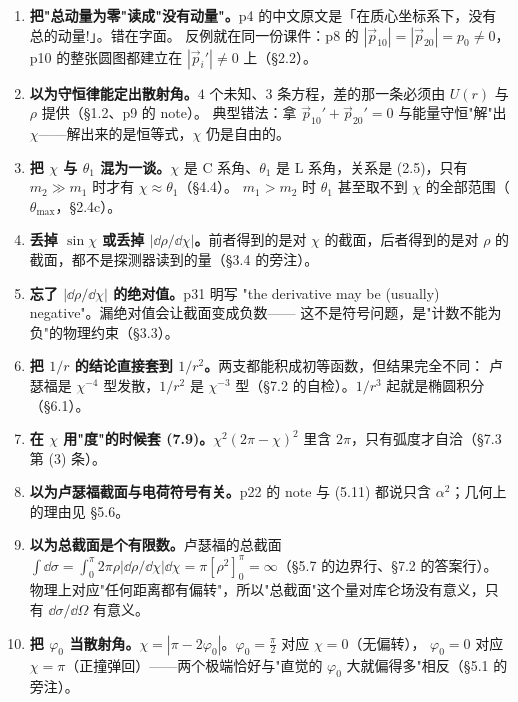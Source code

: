\documentclass[11pt]{ctexart}
\providecommand{\th}{}\renewcommand{\th}{\theta}
\begin{document}
\begin{enumerate}
\item \textbf{把"总动量为零"读成"没有动量"。}p4 的中文原文是「在质心坐标系下，没有总的动量!」。错在字面。
反例就在同一份课件：p8 的 $|\vec p_{10}|=|\vec p_{20}|=p_0\neq0$，p10 的整张圆图都建立在 $|\vec p_i'|\neq0$ 上（§2.2）。
\item \textbf{以为守恒律能定出散射角。}$4$ 个未知、$3$ 条方程，差的那一条必须由 $U(r)$ 与 $\rho$ 提供（§1.2、p9 的 note）。
典型错法：拿 $\vec p_{10}'+\vec p_{20}'=0$ 与能量守恒"解"出 $\chi$——解出来的是恒等式，$\chi$ 仍是自由的。
\item \textbf{把 $\chi$ 与 $\th_1$ 混为一谈。}$\chi$ 是 C 系角、$\th_1$ 是 L 系角，关系是 (2.5)，只有 $m_2\gg m_1$ 时才有 $\chi\approx\th_1$（§4.4）。
$m_1>m_2$ 时 $\th_1$ 甚至取不到 $\chi$ 的全部范围（$\th_{\max}$，§2.4c）。
\item \textbf{丢掉 $\sin\chi$ 或丢掉 $|\dd\rho/\dd\chi|$。}前者得到的是对 $\chi$ 的截面，后者得到的是对 $\rho$ 的截面，都不是探测器读到的量（§3.4 的旁注）。
\item \textbf{忘了 $|\dd\rho/\dd\chi|$ 的绝对值。}p31 明写 "the derivative may be (usually) negative"。漏绝对值会让截面变成负数——
这不是符号问题，是"计数不能为负"的物理约束（§3.3）。
\item \textbf{把 $1/r$ 的结论直接套到 $1/r^{2}$。}两支都能积成初等函数，但结果完全不同：
卢瑟福是 $\chi^{-4}$ 型发散，$1/r^{2}$ 是 $\chi^{-3}$ 型（§7.2 的自检）。$1/r^{3}$ 起就是椭圆积分（§6.1）。
\item \textbf{在 $\chi$ 用"度"的时候套 (7.9)。}$\chi^{2}(2\pi-\chi)^{2}$ 里含 $2\pi$，只有弧度才自洽（§7.3 第 (3) 条）。
\item \textbf{以为卢瑟福截面与电荷符号有关。}p22 的 note 与 (5.11) 都说只含 $\alpha^{2}$；几何上的理由见 §5.6。
\item \textbf{以为总截面是个有限数。}卢瑟福的总截面 $\int\dd\sigma=\int_0^\pi2\pi\rho|\dd\rho/\dd\chi|\dd\chi=\pi[\rho^2]_{0}^{\pi}=\infty$（§5.7 的边界行、§7.2 的答案行）。
物理上对应"任何距离都有偏转"，所以"总截面"这个量对库仑场没有意义，只有 $\dd\sigma/\dd\Omega$ 有意义。
\item \textbf{把 $\varphi_0$ 当散射角。}$\chi=|\pi-2\varphi_0|$。$\varphi_0=\frac\pi2$ 对应 $\chi=0$（无偏转），
$\varphi_0=0$ 对应 $\chi=\pi$（正撞弹回）——两个极端恰好与"直觉的 $\varphi_0$ 大就偏得多"相反（§5.1 的旁注）。
\end{enumerate}

\end{document}
